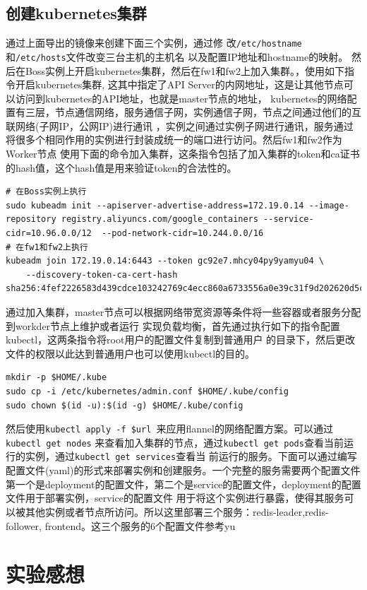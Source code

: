 \documentclass{article}
\begin{document}
\subsection{创建kubernetes集群}
\indent 通过上面导出的镜像来创建下面三个实例，通过修
改\texttt{/etc/hostname}和\texttt{/etc/hosts}文件改变三台主机的主机名
以及配置IP地址和hostname的映射。
然后在Boss实例上开启kubernetes集群，然后在fw1和fw2上加入集群。，使用如下指令开启kubernetes集群,
这其中指定了API Server的内网地址，这是让其他节点可以访问到kubernetes的API地址，也就是master节点的地址，
kubernetes的网络配置有三层，节点通信网络，服务通信子网，实例通信子网，节点之间通过他们的互联网络(子网IP，公网IP)进行通讯
，实例之间通过实例子网进行通讯，服务通过将很多个相同作用的实例进行封装成统一的端口进行访问。然后fw1和fw2作为Worker节点
使用下面的命令加入集群，这条指令包括了加入集群的token和ca证书的hash值，这个hash值是用来验证token的合法性的。
\begin{lstlisting}[style=bashstyle]
# 在Boss实例上执行
sudo kubeadm init --apiserver-advertise-address=172.19.0.14 --image-repository registry.aliyuncs.com/google_containers --service-cidr=10.96.0.0/12  --pod-network-cidr=10.244.0.0/16
# 在fw1和fw2上执行
kubeadm join 172.19.0.14:6443 --token gc92e7.mhcy04py9yamyu04 \
    --discovery-token-ca-cert-hash sha256:4fef2226583d439cdce103242769c4ecc860a6733556a0e39c31f9d202620d5c
\end{lstlisting}
通过加入集群，master节点可以根据网络带宽资源等条件将一些容器或者服务分配到workder节点上维护或者运行
实现负载均衡，首先通过执行如下的指令配置kubectl，这两条指令将root用户的配置文件复制到普通用户
的目录下，然后更改文件的权限以此达到普通用户也可以使用kubectl的目的。
\begin{lstlisting}[style=bashstyle]
mkdir -p $HOME/.kube
sudo cp -i /etc/kubernetes/admin.conf $HOME/.kube/config
sudo chown $(id -u):$(id -g) $HOME/.kube/config
\end{lstlisting}
然后使用\texttt{kubectl apply -f \${url} }来应用flannel的网络配置方案。可以通过\texttt{kubectl get nodes}
来查看加入集群的节点，通过\texttt{kubectl get pods}查看当前运行的实例，通过\texttt{kubectl get services}查看当
前运行的服务。下面可以通过编写配置文件(yaml)的形式来部署实例和创建服务。一个完整的服务需要两个配置文件
第一个是deployment的配置文件，第二个是service的配置文件，deployment的配置文件用于部署实例，service的配置文件
用于将这个实例进行暴露，使得其服务可以被其他实例或者节点所访问。所以这里部署三个服务：redis-leader,redis-follower,
frontend。这三个服务的6个配置文件参考yu
\section{实验感想}
\end{document}
